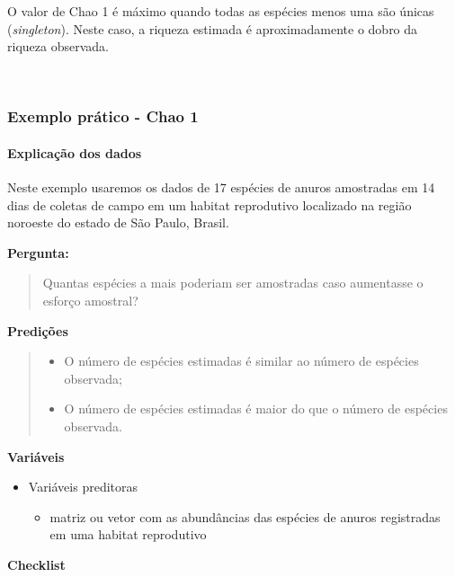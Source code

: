 \documentclass[
]{book}
\providecommand{\tightlist}{%
  \setlength{\itemsep}{0pt}\setlength{\parskip}{0pt}}
\begin{document}
O valor de Chao 1 é máximo quando todas as espécies menos uma são únicas (\emph{singleton}). Neste caso, a riqueza estimada é aproximadamente o dobro da riqueza observada.

~

\hypertarget{exemplo-pruxe1tico---chao-1}{%
\subsubsection{Exemplo prático - Chao 1}\label{exemplo-pruxe1tico---chao-1}}

\hypertarget{explicauxe7uxe3o-dos-dados}{%
\paragraph{Explicação dos dados}\label{explicauxe7uxe3o-dos-dados}}

Neste exemplo usaremos os dados de 17 espécies de anuros amostradas em 14 dias de coletas de campo em um habitat reprodutivo localizado na região noroeste do estado de São Paulo, Brasil.

\textbf{Pergunta:}

\begin{quote}
Quantas espécies a mais poderiam ser amostradas caso aumentasse o esforço amostral?
\end{quote}

\textbf{Predições}

\begin{quote}
\begin{itemize}
\tightlist
\item
  O número de espécies estimadas é similar ao número de espécies observada;
\item
  O número de espécies estimadas é maior do que o número de espécies observada.
\end{itemize}
\end{quote}

\textbf{Variáveis}

\begin{itemize}
\tightlist
\item
  Variáveis preditoras

  \begin{itemize}
  \tightlist
  \item
    matriz ou vetor com as abundâncias das espécies de anuros registradas em uma habitat reprodutivo
  \end{itemize}
\end{itemize}

\textbf{Checklist}
\end{document}
